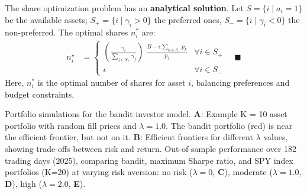 \documentclass[aspectratio=169]{beamer}
\begin{document}
\begin{frame}
The share optimization problem has an \textbf{analytical solution}. 
Let $S = \{i \mid a_i = 1\}$ be the available assets; $S_+ = \{i \mid \gamma_i > 0\}$ the preferred ones, $S_- = \{i \mid \gamma_i < 0\}$ the non-preferred.
The optimal shares $n_i^*$ are:
\begin{align*}
n_{i}^{\star} & = \begin{cases}
\left(\frac{\gamma_{i}}{\sum_{j\in{S}_{+}}\gamma_{j}}\right)\;\frac{B - \epsilon\sum_{k\in{S}_{-}}p_{k}}{p_{i}} & \forall{i}\in{S}_{+}\\
\epsilon & \forall{i}\in{S}_{-}
\end{cases}\quad\blacksquare    
\end{align*}
Here, $n_i^*$ is the optimal number of shares for asset $i$, balancing preferences and budget constraints.
\end{frame}

\begin{frame}
Portfolio simulations for the bandit investor model. 
\textbf{A}: Example K = 10 asset portfolio with random fill prices and $\lambda = 1.0$. The bandit portfolio (red) is near the efficient frontier, but not on it.
\textbf{B}: Efficient frontiers for different $\lambda$ values, showing trade-offs between risk and return.
Out-of-sample performance over 182 trading days (2025), comparing bandit, maximum Sharpe ratio, and SPY index portfolios (K=20) at varying risk aversion: no risk ($\lambda=0$, \textbf{C}), moderate ($\lambda=1.0$, \textbf{D}), high ($\lambda=2.0$, \textbf{E}).
\end{frame}
\end{document}
